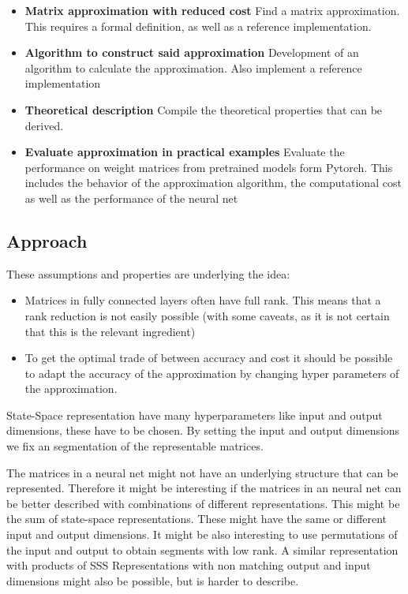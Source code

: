 \documentclass[lang=ngerman,inputenc=utf8,fontsize=10pt]{ldvarticle}
\begin{document}
\begin{itemize}

	\item\textbf{Matrix approximation with reduced cost} Find a matrix approximation. This requires a formal definition, as well as a reference implementation.
	\item\textbf{Algorithm to construct said approximation} Development of an algorithm to calculate the approximation. Also implement a reference implementation
	\item\textbf{Theoretical description} Compile the theoretical properties that can be derived.
	\item\textbf{Evaluate approximation in practical examples} Evaluate the performance on weight matrices from pretrained models form Pytorch. This includes the behavior of the approximation algorithm, the computational cost as well as the performance of the neural net
\end{itemize}





\subsection*{Approach}

These assumptions and properties are underlying the idea:
\begin{itemize}
	\item Matrices in fully connected layers often have full rank. This means that a rank reduction is not easily possible (with some caveats, as it is not certain that this is the relevant ingredient) \cite{martin_implicit_2018}
	\item To get the optimal trade of between accuracy and cost it should be possible to adapt the accuracy of the approximation by changing hyper parameters of the approximation.
\end{itemize}

State-Space representation have many hyperparameters like input and output dimensions, these have to be chosen. By setting the input and output dimensions we fix an segmentation of the representable matrices.

The matrices in a neural net might not have an underlying structure that can be represented.
Therefore it might be interesting if the matrices in an neural net can be better described with combinations of different representations.
This might be the sum of state-space representations. These might have the same or different input and output dimensions.
It might be also interesting to use permutations of the input and output to obtain segments with low rank.
A similar representation with products of SSS Representations with non matching output and input dimensions might also be possible, but is harder to describe.
\end{document}
